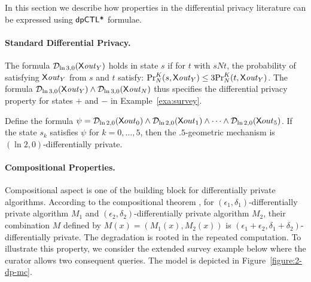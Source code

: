 In this section we describe how properties in the differential privacy literature can be expressed using $\dpCTLstar$ formulae.

\paragraph{Standard Differential Privacy.}
The formula $\dpriv{\ln 3}{0} (\X \mathit{out}_Y)$ holds in state $s$ if for  $t$ with $sNt$, the probability of satisfying $\X \mathit{out}_Y$ from $s$ and $t$ satisfy:
$\myPr{s}{K}{N}{\X \mathit{out}_Y}\le 3\myPr{t}{K}{N}{\X \mathit{out}_Y}$. The formula $\dpriv{\ln 3}{0} (\X \mathit{out}_Y)\wedge \dpriv{\ln 3}{0} (\X \mathit{out}_N)$ thus specifies the differential privacy property for states $+$ and $-$ in Example~\ref{exa:survey}.

 Define the formula
$\psi = \dpriv{\ln 2}{0} (\X out_0) \wedge \dpriv{\ln 2}{0} (\X out_1) \wedge
\cdots \wedge \dpriv{\ln 2}{0} (\X out_5)$. If the state $s_k$ satisfies
$\psi$ for $k = 0, \ldots, 5$, then the $.5$-geometric mechanism is
$(\ln 2, 0)$-differentially private.


\paragraph{Compositional Properties.}
Compositional aspect is one of the building block for differentially private algorithms. According to the compositional theorem \cite[Theorem 3.16]{DR:14:AFDP}, for $(\epsilon_1,\delta_1)$-differentially private algorithm $M_1$ and
$(\epsilon_2,\delta_2)$-differentially private algorithm $M_2$, their combination $M$ defined by $M(x)=(M_1(x), M_2(x))$ is $(\epsilon_1 + \epsilon_2,\delta_1+\delta_2)$-differentially private. The degradation is rooted in the repeated computation. To illustrate this property, we consider the extended survey example below where the curator allows two consequent queries.
The model is depicted in Figure~\ref{figure:2-dp-mc}.

